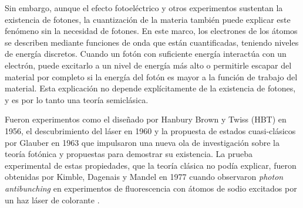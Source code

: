 Sin embargo, aunque el efecto fotoeléctrico y otros experimentos sustentan la existencia de fotones, la cuantización de la materia también puede explicar este fenómeno sin la necesidad de fotones. En este marco, los electrones de los átomos se describen mediante funciones de onda que están cuantificadas, teniendo niveles de energía discretos. Cuando un fotón con suficiente energía interactúa con un electrón, puede excitarlo a un nivel de energía más alto o permitirle escapar del material por completo si la energía del fotón es mayor a la función de trabajo del material. Esta explicación no depende explícitamente de la existencia de fotones, y es por lo tanto una teoría semiclásica.

Fueron experimentos como el diseñado por Hanbury Brown y Twiss (HBT) en 1956, el descubrimiento del láser en 1960 y la propuesta de estados cuasi-clásicos por Glauber en 1963 que impulsaron una nueva ola de investigación sobre la teoría fotónica y propuestas para demostrar su existencia. La prueba experimental de estas propiedades, que la teoría clásica no podía explicar, fueron obtenidas por Kimble, Dagenais y Mandel en 1977 cuando observaron \textit{photon antibunching} en experimentos de fluorescencia con átomos de sodio excitados por un haz láser de colorante \cite{PhysRevLett.39.691}.